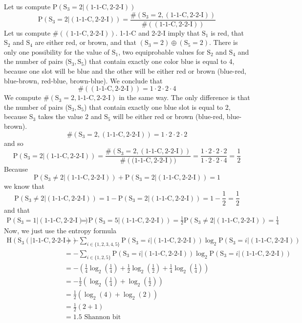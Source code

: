 \documentclass{article}
\begin{document}
Let us compute $\mbox{P}(\mbox{S}_3=2|(\mbox{1-1-C},\mbox{2-2-I}))$
$$
\mbox{P}(\mbox{S}_3=2|(\mbox{1-1-C},\mbox{2-2-I})) = \frac{\#(\mbox{S}_3=2,(\mbox{1-1-C},\mbox{2-2-I}))}{\#((\mbox{1-1-C},\mbox{2-2-I}))}
$$
Let us compute $\#((\mbox{1-1-C},\mbox{2-2-I}))$. 1-1-C and 2-2-I imply that $\mbox{S}_1$ is red, that $\mbox{S}_2$ and $\mbox{S}_4$ are either red, or brown, and that $(\mbox{S}_3 =2)\oplus(\mbox{S}_5=2)$. There is only one possibility for the value of $\mbox{S}_1$, two equiprobable values for $\mbox{S}_2$ and $\mbox{S}_4$ and the number of pairs ($\mbox{S}_3, \mbox{S}_5$) that contain exactly one color blue is equal to 4, because one slot will be blue and the other will be either red or brown (blue-red, blue-brown, red-blue, brown-blue). We conclude that
$$
\#((\mbox{1-1-C},\mbox{2-2-I}) )= 1\cdot2\cdot2\cdot4 
$$
We compute $\#(\mbox{S}_3=2,\mbox{1-1-C},\mbox{2-2-I})$ in the same way. The only difference is that the number of pairs ($\mbox{S}_3,\mbox{S}_5$) that contain exactly one blue slot is equal to 2, because $\mbox{S}_3$ takes the value 2 and $\mbox{S}_5$ will be either red or brown (blue-red, blue-brown).
$$
\#(\mbox{S}_3=2,(\mbox{1-1-C},\mbox{2-2-I}))=1\cdot2\cdot2\cdot2
$$
and so
$$
\mbox{P}(\mbox{S}_3=2|(\mbox{1-1-C},\mbox{2-2-I})) = \frac{\#(\mbox{S}_3=2,(\mbox{1-1-C},\mbox{2-2-I}))}{\#(\mbox{(1-1-C},\mbox{2-2-I}))} = \frac{1\cdot2\cdot2\cdot2}{1\cdot2\cdot2\cdot4 }=\frac{1}{2}
$$
Because
$$
\mbox{P}(\mbox{S}_3\not=2|(\mbox{1-1-C},\mbox{2-2-I})) + \mbox{P}(\mbox{S}_3=2|(\mbox{1-1-C},\mbox{2-2-I})) = 1
$$
we know that
$$
\mbox{P}(\mbox{S}_3\not=2|(\mbox{1-1-C},\mbox{2-2-I})) = 1-\mbox{P}(\mbox{S}_3=2|(\mbox{1-1-C},\mbox{2-2-I})) = 1 - \frac{1}{2} = \frac{1}{2}
$$
and that 
\begin{align*}
\mbox{P}(\mbox{S}_3=1|(\mbox{1-1-C},\mbox{2-2-I})) &= \mbox{P}(\mbox{S}_3=5|(\mbox{1-1-C},\mbox{2-2-I})) =\frac{1}{2} \mbox{P}(\mbox{S}_3\not=2|(\mbox{1-1-C},\mbox{2-2-I})) = \frac{1}{4}
\end{align*}
Now, we just use the entropy formula
\begin{align*}
\mbox{H}(\mbox{S}_3(|\mbox{1-1-C},\mbox{2-2-I})) &= -\sum_{i\in\{1,2,3,4,5\}}\mbox{P}(\mbox{S}_3=i|(\mbox{1-1-C},\mbox{2-2-I}))\log_2\mbox{P}(\mbox{S}_3=i|(\mbox{1-1-C},\mbox{2-2-I}))\\
&=-\sum_{i\in\{1,2,5\}}\mbox{P}(\mbox{S}_3=i|(\mbox{1-1-C},\mbox{2-2-I}))\log_2\mbox{P}(\mbox{S}_3=i|(\mbox{1-1-C},\mbox{2-2-I}))\\
&= -\left(\frac{1}{4}\log_2\left(\frac{1}{4}\right) + \frac{1}{2}\log_2\left(\frac{1}{2}\right) + \frac{1}{4}\log_2\left(\frac{1}{4}\right) \right)\\
&=-\frac{1}{2}\left(\log_2\left(\frac{1}{4}\right) + \log_2\left(\frac{1}{2}\right)\right)\\
&=\frac{1}{2} (\log_2(4) + \log_2(2))\\
&=\frac{1}{2}(2+1)\\
&=1.5 \mbox{ Shannon bit}
\end{align*}
\end{document}
